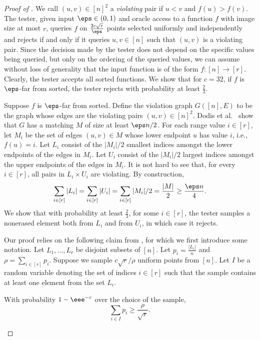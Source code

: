 \documentclass{toc}
\begin{document}
\begin{proof}[Proof of ] 
We call $(u, v) \in [n]^2$ a \emph{violating} pair if $u < v$ and $f(u) > f(v)$. The tester, given input $\eps \in (0,1)$ and oracle access to a function $f$ with image size at most $r$, queries $f$ on $\frac{2c\sqrt{r}}{\eps}$ points selected uniformly and independently and rejects if and only if it queries $u, v \in [n]$ such that $(u,v)$ is a violating pair.
Since the decision made by the tester does not depend on the specific values being queried, but only on the ordering of the queried values, we can assume without loss of generality that the input function is of the form $f:[n] \to [r]$. Clearly, the tester accepts all sorted functions. We show that for $c = 32$, if $f$ is $\eps$-far from sorted, the tester rejects with probability at least $\frac{2}{3}$. 

Suppose $f$ is $\eps$-far from sorted. Define the violation graph $G([n], E)$ to be the graph whose edges are the violating pairs $(u, v) \in [n]^2$. Dodis et al.~\cite[Lemma 7]{DGLRRS99} show that $G$ has a matching $M$  of size at least $\eps n /2$. For each range value $i \in [r]$, let $ M_i$ be the set of edges  $(u, v) \in M$ whose lower endpoint $u$ has value $i$, i.e., $f(u) = i$. Let $L_i$ consist of the $|M_i|/2$ smallest indices amongst the lower endpoints of the edges in $M_i$. Let $U_i$ consist of the $|M_i|/2$ largest indices amongst the upper endpoints of the  edges in $M_i$. It is not hard to see that, for every $i\in[r]$, all pairs in $L_i \times U_i$ are violating. By construction, 
\begin{equation}\label{eq:matching}
    \sum_{i \in [r]} |L_i| = \sum_{i \in [r]} |U_i| = \sum_{i \in [r]} |M_i|/2 = \frac{|M|}{2} \geq \frac{\eps n }{4}. 
\end{equation}
We show that with probability at least $\frac{2}{3}$, for some $i \in [r]$, the tester samples a nonerased element both from $L_i$ and from $U_i$, in which case it rejects. 


Our proof relies on the following claim from \cite{GGLRS00}, for which we first introduce some notation. Let $L_1,\dots, L_r$ be disjoint subsets of $[n]$. Let $p_i = \frac{|L_i|}{n}$ and $\rho = \sum_{i \in [r]} p_i$. Suppose we sample $c\sqrt{r}/ \rho$ uniform points from $[n]$. Let $I$ be a random variable denoting the set of indices $i \in [r]$ such that the sample contains at least one element from the set $L_i$. 

\begin{claim} \label{clm:gglrs}
With probability $1 - \eee^{-c}$ over the choice of the sample, 
\begin{equation*}
    \sum_{i \in I} p_i \geq \frac{\rho}{\sqrt{r}}.
\end{equation*}
\end{claim}




\end{proof}
\end{document}
